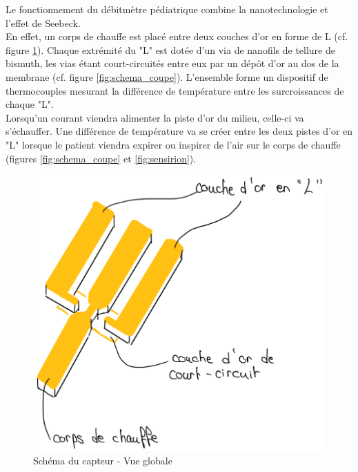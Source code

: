 Le fonctionnement du débitmètre pédiatrique combine la nanotechnologie et l'effet de Seebeck. \\
En effet, un corps de chauffe est placé entre deux couches d'or en forme de L (cf. figure \ref{fig:schema_global}). Chaque extrémité du "L" est 
dotée d'un via de nanofils de tellure de bismuth, les vias étant court-circuités entre eux par un dépôt d'or au dos de la membrane (cf. figure 
\ref{fig:schema_coupe}). L'ensemble forme un dispositif de thermocouples mesurant la différence de température entre les surcroissances de chaque "L".\\
Lorsqu'un courant viendra 
alimenter la piste d'or du milieu, celle-ci va s'échauffer. Une différence de température va se créer entre les deux pistes d'or en "L" lorsque 
le patient viendra expirer ou inspirer de l'air sur le corps de chauffe (figures \ref{fig:schema_coupe} et \ref{fig:sensirion}). 
\begin{figure}[H]
    \centering
    \includegraphics[scale = 0.4]{assets/figures/schema_capteur_vue_generale.png}
    \caption{Schéma du capteur - Vue globale}
    \label{fig:schema_global}
\end{figure}
